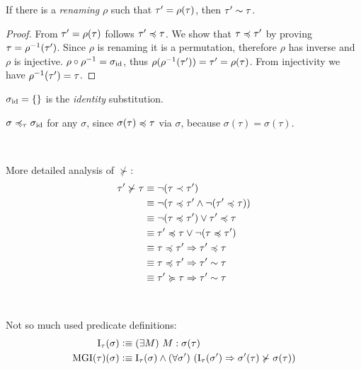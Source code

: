 \documentclass[a4paper,oneside]{memoir}
\begin{document}
\begin{lemma}
\label{lem:ren2}
If there is a \textit{renaming} $\rho$ such that $\tau^\prime = \rho(\tau)$, then $\tau^\prime \sim \tau$.
\end{lemma}
\begin{proof}
From $\tau^\prime = \rho(\tau)$ follows $\tau^\prime \preccurlyeq \tau$. We show that $\tau \preccurlyeq \tau^\prime$ by proving $\tau = \rho^{-1}(\tau^\prime)$. Since $\rho$ is renaming it is a permutation, therefore $\rho$ has inverse and $\rho$ is injective. $\rho \circ \rho^{-1} = \sigma_{\operatorname{id}}$, thus $\rho(\rho^{-1}(\tau^\prime)) = \tau^\prime = \rho(\tau)$. From injectivity we have $\rho^{-1}(\tau^\prime) = \tau$.
\end{proof}



\begin{definition}
$\sigma_{\operatorname{id}} = \{\}$ is the \textit{identity} substitution. 
\end{definition}
\begin{remark}
$\sigma \preccurlyeq_\tau \sigma_{\operatorname{id}}$ for any $\sigma$, since $\sigma(\tau) \preccurlyeq \tau$ via $\sigma$, because $\sigma(\tau) = \sigma(\tau)$.
\end{remark}

~

More detailed analysis of $\nsucc$:
\begin{align*}
\tau^\prime \nsucc \tau &\equiv \neg (\tau \prec \tau^\prime)   \\
  &\equiv \neg (\tau \preccurlyeq \tau^\prime \wedge \neg (\tau^\prime \preccurlyeq \tau) )   \\
  &\equiv \neg (\tau \preccurlyeq \tau^\prime) \vee \tau^\prime \preccurlyeq \tau   \\  
  &\equiv \tau^\prime \preccurlyeq \tau \vee  \neg (\tau \preccurlyeq \tau^\prime)    \\
  &\equiv \tau \preccurlyeq \tau^\prime \Rightarrow \tau^\prime \preccurlyeq \tau   \\  
  &\equiv \tau \preccurlyeq \tau^\prime \Rightarrow \tau^\prime \sim \tau   \\ 
  &\equiv \tau^\prime \succcurlyeq \tau \Rightarrow \tau^\prime \sim \tau   \\ 
\end{align*}

~

Not so much used predicate definitions:
\begin{align*}
\operatorname{I}_\tau(\sigma)  &\mathrel{\vcentcolon\equiv} (\exists M)\ M : \sigma(\tau)  \\
\operatorname{MGI}(\tau)(\sigma) &\mathrel{\vcentcolon\equiv} \operatorname{I}_\tau(\sigma) \wedge (\forall \sigma^\prime)\ (\operatorname{I}_\tau(\sigma^\prime) \Rightarrow\sigma^\prime(\tau) \nsucc \sigma(\tau))\\
\end{align*}
\end{document}
